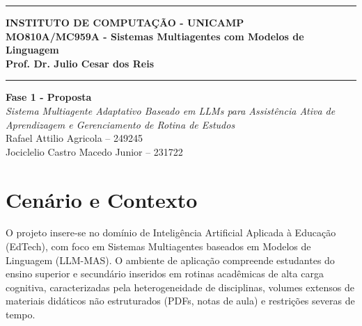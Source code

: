\documentclass[12pt]{article}
\renewcommand{\headrulewidth}{0pt} %
\begin{document}
\vspace{5mm}
\hrule

\vspace{3mm}

\begin{center}
    {\large\textbf{INSTITUTO DE COMPUTAÇÃO - UNICAMP}} \\
    \vspace{3mm}
    {\large\textbf{MO810A/MC959A - Sistemas Multiagentes com Modelos de Linguagem}} \\
    \vspace{3mm}
    {\large\textbf{Prof. Dr. Julio Cesar dos Reis}}
\end{center}

\vspace{3mm}
\hrule

\vspace{2.5cm}
\begin{flushright}
    \Large{\textbf{Fase 1 - Proposta}} \\
    \vspace{1cm}
    \textit{
        Sistema Multiagente Adaptativo Baseado em LLMs para Assistência Ativa de Aprendizagem e Gerenciamento de Rotina de Estudos \\
    }
    \vspace{5cm}
    Rafael Attilio Agricola -- 249245 \\
    Jociclelio Castro Macedo Junior -- 231722
\end{flushright}



\newpage
\pagestyle{fancy} %
\fancyhf{} %
\renewcommand{\headrulewidth}{0pt} %

\fancyfoot[R]{\thepage}



\section{Cenário e Contexto}
\label{sec:contexto}
O projeto insere-se no domínio de Inteligência Artificial Aplicada à Educação (EdTech), com foco em Sistemas Multiagentes baseados em Modelos de Linguagem (LLM-MAS). O ambiente de aplicação compreende estudantes do ensino superior e secundário inseridos em rotinas acadêmicas de alta carga cognitiva, caracterizadas pela heterogeneidade de disciplinas, volumes extensos de materiais didáticos não estruturados (PDFs, notas de aula) e restrições severas de tempo.
\end{document}
